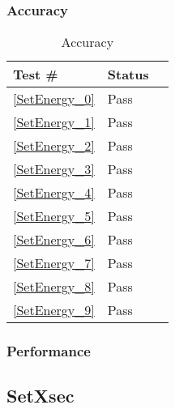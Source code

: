 \documentclass[12pt]{article}
\begin{document}
	\subsubsection{Accuracy}
		\begin{table}[H]
		\centering
		\caption{Accuracy}\label{GetY_acc}
		\begin{tabular}{lll}
		\toprule
		\bf Test \# & Status \\\midrule
		\ref{SetEnergy_0} & Pass\\
		\ref{SetEnergy_1} & Pass\\
		\ref{SetEnergy_2} & Pass\\
		\ref{SetEnergy_3} & Pass\\
		\ref{SetEnergy_4} & Pass\\
		\ref{SetEnergy_5} & Pass\\
		\ref{SetEnergy_6} & Pass\\
		\ref{SetEnergy_7} & Pass\\
		\ref{SetEnergy_8} & Pass\\
		\ref{SetEnergy_9} & Pass\\
		\bottomrule
		\end{tabular}
		\end{table}
	\subsubsection{Performance}

\subsection{SetXsec} %
\end{document}

